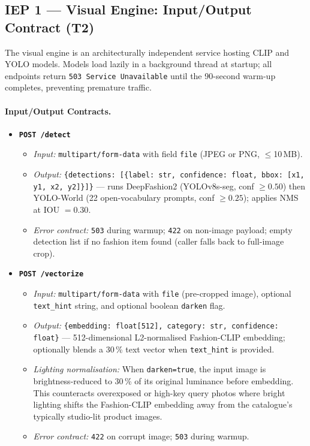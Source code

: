 \documentclass[12pt]{article}
\begin{document}
\subsection{IEP 1 --- Visual Engine: Input/Output Contract (T2)}

The visual engine is an architecturally independent service hosting CLIP and YOLO models. Models load lazily in a background thread at startup; all endpoints return \texttt{503 Service Unavailable} until the 90-second warm-up completes, preventing premature traffic.

\paragraph{Input/Output Contracts.}

\begin{itemize}[leftmargin=*]
    \item \textbf{\texttt{POST /detect}}
      \begin{itemize}
          \item \emph{Input:} \texttt{multipart/form-data} with field \texttt{file} (JPEG or PNG, $\le$10\,MB).
          \item \emph{Output:} \texttt{\{detections: [\{label: str, confidence: float, bbox: [x1, y1, x2, y2]\}]\}} --- runs DeepFashion2 (YOLOv8s-seg, conf $\ge 0.50$) then YOLO-World (22 open-vocabulary prompts, conf $\ge 0.25$); applies NMS at IOU $= 0.30$.
          \item \emph{Error contract:} \texttt{503} during warmup; \texttt{422} on non-image payload; empty detection list if no fashion item found (caller falls back to full-image crop).
      \end{itemize}

    \item \textbf{\texttt{POST /vectorize}}
      \begin{itemize}
          \item \emph{Input:} \texttt{multipart/form-data} with \texttt{file} (pre-cropped image), optional \texttt{text\_hint} string, and optional boolean \texttt{darken} flag.
          \item \emph{Output:} \texttt{\{embedding: float[512], category: str, confidence: float\}} --- 512-dimensional L2-normalised Fashion-CLIP embedding; optionally blends a 30\,\% text vector when \texttt{text\_hint} is provided.
          \item \emph{Lighting normalisation:} When \texttt{darken=true}, the input image is brightness-reduced to 30\,\% of its original luminance before embedding. This counteracts overexposed or high-key query photos where bright lighting shifts the Fashion-CLIP embedding away from the catalogue's typically studio-lit product images.
          \item \emph{Error contract:} \texttt{422} on corrupt image; \texttt{503} during warmup.
      \end{itemize}


\end{itemize}
\end{document}
